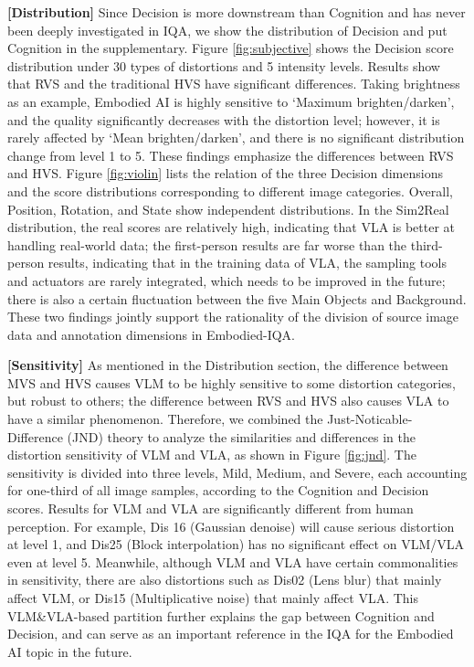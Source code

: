 \documentclass{article}
\begin{document}
\textbf{[Distribution]} Since Decision is more downstream than Cognition and has never been deeply investigated in IQA, we show the distribution of Decision and put Cognition in the supplementary. Figure \ref{fig:subjective} shows the Decision score distribution under 30 types of distortions and 5 intensity levels. Results show that RVS and the traditional HVS have significant differences. Taking brightness as an example, Embodied AI is highly sensitive to `Maximum brighten/darken', and the quality significantly decreases with the distortion level; however, it is rarely affected by `Mean brighten/darken', and there is no significant distribution change from level 1 to 5. These findings emphasize the differences between RVS and HVS. Figure \ref{fig:violin} lists the relation of the three Decision dimensions and the score distributions corresponding to different image categories. Overall, Position, Rotation, and State show independent distributions. In the Sim2Real distribution, the real scores are relatively high, indicating that VLA is better at handling real-world data; the first-person results are far worse than the third-person results, indicating that in the training data of VLA, the sampling tools and actuators are rarely integrated, which needs to be improved in the future; there is also a certain fluctuation between the five Main Objects and Background. These two findings jointly support the rationality of the division of source image data and annotation dimensions in Embodied-IQA.

\textbf{[Sensitivity]} As mentioned in the Distribution section, the difference between MVS and HVS causes VLM to be highly sensitive to some distortion categories, but robust to others; the difference between RVS and HVS also causes VLA to have a similar phenomenon. Therefore, we combined the Just-Noticable-Difference (JND) theory to analyze the similarities and differences in the distortion sensitivity of VLM and VLA, as shown in Figure \ref{fig:jnd}. The sensitivity is divided into three levels, Mild, Medium, and Severe, each accounting for one-third of all image samples, according to the Cognition and Decision scores. Results for VLM and VLA are significantly different from human perception. For example, Dis 16 (Gaussian denoise) will cause serious distortion at level 1, and Dis25 (Block interpolation) has no significant effect on VLM/VLA even at level 5. Meanwhile, although VLM and VLA have certain commonalities in sensitivity, there are also distortions such as Dis02 (Lens blur) that mainly affect VLM, or Dis15 (Multiplicative noise) that mainly affect VLA. This VLM\&VLA-based partition further explains the gap between Cognition and Decision, and can serve as an important reference in the IQA for the Embodied AI topic in the future.
\end{document}
